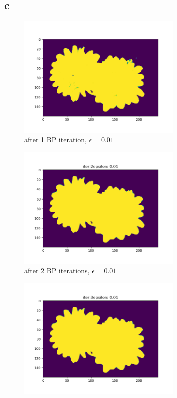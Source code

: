 \documentclass[12pt]{article}
\begin{document}
\begin{section}{4.6}
	\subsection{c}
		\begin{figure}[H]
		\includegraphics[width=0.7\textwidth]{iter1_0_01.png}
		\caption{after 1 BP iteration, $\epsilon = 0.01$}
	\end{figure}
	\begin{figure}[H]
		\includegraphics[width=0.7\textwidth]{iter2_0_01.png}
		\caption{after 2 BP iterations, $\epsilon = 0.01$}
	\end{figure}
		\begin{figure}[H]
		\includegraphics[width=0.7\textwidth]{iter3_0_01.png}

\end{figure}
\end{section}
\end{document}
